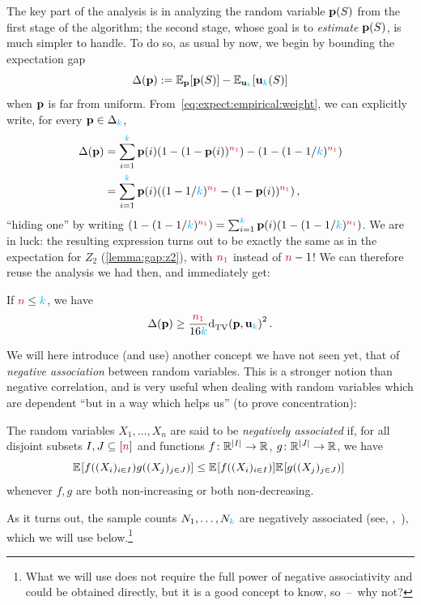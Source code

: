 The key part of the analysis is in analyzing the random variable $\mathbf{p}(S)$ from the first stage of the algorithm; the second stage, whose goal is to \emph{estimate} $\mathbf{p}(S)$, is much simpler to handle. To do so, as usual by now, we begin by bounding the expectation gap
\begin{equation}
    \Delta(\p) \eqdef \bE{\p}{\p(S)} - \bE{\uniform_\ab}{\uniform_\ab(S)}
\end{equation}
when $\mathbf{p}$ is far from uniform. From~\cref{eq:expect:empirical:weight}, we can explicitly write, for every $\mathbf{p}\in\Delta_{{\textcolor{cyan}{k}}}$,
\begin{align*}
  \Delta(\p) 
  &= \sum_{i=1}^\ab \p(i) (1-(1-\p(i))^{\nss}) - \Paren{1-(1-1/\ab)^{\nss}} \\
  &= \sum_{i=1}^\ab \p(i) \Paren{ (1-1/\ab)^{\nss} - (1-\p(i))^{\nss} }\,,
\end{align*}
``hiding one'' by writing $\Paren{1-(1-1/\ab)^{\nss}} = \sum_{i=1}^\ab \p(i)\Paren{1-(1-1/\ab)^{\nss}}$. We are in luck: the resulting expression turns out to be exactly the same as in the expectation for $Z_2$ (\cref{lemma:gap:z2}), with $\textcolor{red}{{\textcolor{purple}{n}}_1}$ instead of ${\textcolor{purple}{n}}-1$! We can therefore reuse the analysis we had then, and immediately get:
\begin{lemma}
  \label{lemma:gap:z7}
If ${\textcolor{purple}{n}} \leq {\textcolor{cyan}{k}}$, we have
\[
    \Delta(\p) \geq \frac{\nss}{16\ab}\totalvardist{\p}{\uniform_\ab}^2\,.
\]
\end{lemma}
We will here introduce (and use) another concept we have not seen yet, that of \emph{negative association} between random variables. This is a stronger notion than negative correlation, and is very useful when dealing with random variables which are dependent ``but in a way which helps us'' (to prove concentration):
\begin{definition}
The random variables $X_1,\dots, X_n$ are said to be \emph{negatively associated} if, for all disjoint subsets $I,J\subseteq [{\textcolor{purple}{n}}]$ and functions $f\colon \mathbb{R}^{|I|} \to \mathbb{R}$, $g\colon \mathbb{R}^{|J|} \to \mathbb{R}$, we have
\[
    \bEE{f((X_i)_{i\in I})g((X_j)_{j\in J})} \leq \bEE{f((X_i)_{i\in I})}\bEE{g((X_j)_{j\in J})} \
\]
whenever $f,g$ are both non-increasing or both non-decreasing. 
\end{definition}
As it turns out, the sample counts $N_1,\dots,N_{\textcolor{cyan}{k}}$ are negatively associated (see, \eg,~\citep[Section~2.2]{DubhashiR98}), which we will use below.\footnote{What we will use does not require the full power of negative associativity and could be obtained directly, but it is a good concept to know, so~--~why not?} 
